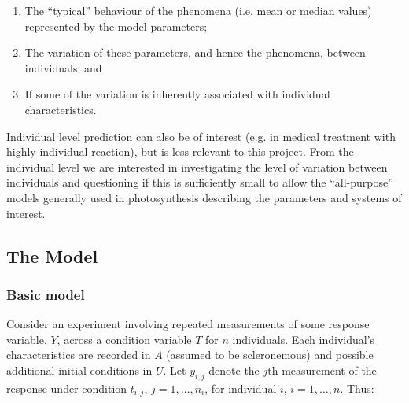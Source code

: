 \documentclass[11pt]{article} %
\begin{document}
\begin{enumerate}
 \item The ``typical'' behaviour of the phenomena (i.e. mean or median values) represented by the model parameters;
 \item The variation of these parameters, and hence the phenomena, between individuals; and
 \item If some of the variation is inherently associated with individual characteristics.
\end{enumerate}
Individual level prediction can also be of interest (e.g. in medical treatment with highly individual reaction), but is less relevant to this project. From the individual level we are interested in investigating the level of variation between individuals and questioning if this is sufficiently small to allow the ``all-purpose'' models generally used in photosynthesis describing the parameters and systems of interest.

\subsection{The Model}
\subsubsection{Basic model}
Consider an experiment involving repeated measurements of some response variable, $Y$, across a condition variable $T$ for $n$ individuals. Each individual's characteristics are recorded in $A$ (assumed to be scleronemous) and possible additional initial conditions in $U$. Let $y_{i,j}$ denote the $j$th measurement of the response under condition $t_{i,j}$, $j = 1,\ldots,n_i$, for individual $i$, $i = 1,\ldots,n$. Thus:
\end{document}
